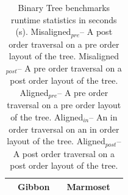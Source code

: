\documentclass[acmsmall,review,anonymous]{acmart}\settopmatter{printfolios=true,printccs=false,printacmref=false}
\newcommand{\system}{{\sc Marmoset}\xspace}
\newcommand{\alignedPre}{{\sc Aligned$_{\mathit{pre}}$}\xspace} %
\newcommand{\alignedIn}{{\sc Aligned$_{\mathit{in}}$}\xspace} %
\newcommand{\alignedPost}{{\sc Aligned$_{\mathit{post}}$}\xspace} %
\newcommand{\misalignedPost}{{\sc Misaligned$_{\mathit{post}}$}\xspace} %
\newcommand{\misalignedPre}{{\sc Misaligned$_{\mathit{pre}}$}\xspace} %
\newcommand{\gibbon}{{\sc Gibbon}\xspace}
\newcommand{\ra}[1]{\renewcommand{\arraystretch}{#1}}
\providecommand{\DIFaddtex}[1]{{\protect\color{blue} \sf #1}} %
\providecommand{\DIFaddFL}[1]{\DIFadd{#1}} %
\providecommand{\DIFaddbeginFL}{} %
\providecommand{\DIFaddendFL}{} %
\providecommand{\DIFadd}[1]{\texorpdfstring{\DIFaddtex{#1}}{#1}} %
\newcommand{\DIFaddincludegraphics}[2][]{{\color{blue}\fbox{\DIFOincludegraphics[#1]{#2}}}} %
\DeclareRobustCommand{\DIFaddbeginFL}{\DIFOaddbeginFL \let\includegraphics\DIFaddincludegraphics} %
\DeclareRobustCommand{\DIFaddendFL}{\DIFOaddendFL \let\includegraphics\DIFOincludegraphics} %
\begin{document}
\begin{table}[]
    \small
    \setlength{\tabcolsep}{3.2pt} \centering
    \ra{1}
    \caption
            { Binary Tree benchmarks runtime statistics \DIFaddbeginFL \DIFaddFL{in seconds (s)}\DIFaddendFL .
              \misalignedPre -- A post order traversal on a pre order layout of the tree.
              \misalignedPost -- A pre order traversal on a post order layout of the tree.
              \alignedPre -- A pre order traversal on a pre order layout of the tree.
              \alignedIn -- An in order traversal on an in order layout of the tree.
              \alignedPost -- A post order traversal on a post order layout of the tree.
              }
    \begin{tabular}{@{}p{0.6in}rcrcrcrcrcrcrcrcr@{}}\toprule
        & \multicolumn{12}{|c|}{{\gibbon}} &
        & \multicolumn{3}{c|}{{\system}}\\ \midrule



\end{tabular}
\end{table}
\end{document}
